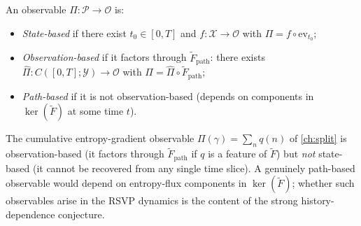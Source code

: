 \documentclass[12pt, oneside]{memoir}
\newcommand{\X}{\mathcal{X}}
\newcommand{\PP}{\mathcal{P}}
\newcommand{\Ft}{\widetilde{F}}
\newcommand{\Fpath}{\widetilde{F}_{\mathrm{path}}}
\begin{document}
\begin{definition}
\label{def:obs-formal}
An observable $\Pi: \PP \to \mathcal{O}$ is:
\begin{itemize}
  \item \emph{State-based} if there exist $t_0 \in [0,T]$ and $f: \X \to \mathcal{O}$
        with $\Pi = f \circ \mathrm{ev}_{t_0}$;
  \item \emph{Observation-based} if it factors through $\Fpath$: there exists
        $\hat\Pi: C([0,T];\mathcal{Y}) \to \mathcal{O}$ with $\Pi = \hat\Pi \circ \Fpath$;
  \item \emph{Path-based} if it is not observation-based (depends on components in
        $\ker(\Ft)$ at some time $t$).
\end{itemize}
\end{definition}

The cumulative entropy-gradient observable $\Pi(\gamma) = \sum_n q(n)$ of \cref{ch:split}
is observation-based (it factors through $\Fpath$ if $q$ is a feature of $\Ft$) but
\emph{not} state-based (it cannot be recovered from any single time slice).  A genuinely
path-based observable would depend on entropy-flux components in $\ker(\Ft)$; whether
such observables arise in the RSVP dynamics is the content of the strong
history-dependence conjecture.
\end{document}
